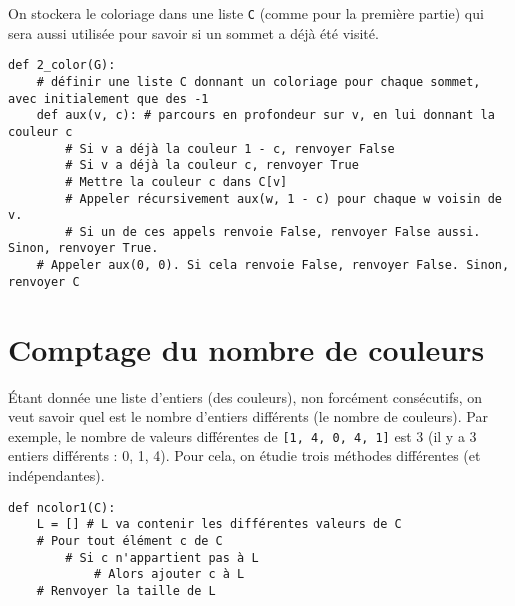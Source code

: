 On stockera le coloriage dans une liste \lstinline{C} (comme pour la première partie) qui sera aussi utilisée pour savoir si un sommet a déjà été
visité.

\begin{lstlisting}
def 2_color(G):
    # définir une liste C donnant un coloriage pour chaque sommet, avec initialement que des -1
    def aux(v, c): # parcours en profondeur sur v, en lui donnant la couleur c
        # Si v a déjà la couleur 1 - c, renvoyer False
        # Si v a déjà la couleur c, renvoyer True
        # Mettre la couleur c dans C[v]
        # Appeler récursivement aux(w, 1 - c) pour chaque w voisin de v.
        # Si un de ces appels renvoie False, renvoyer False aussi. Sinon, renvoyer True.
    # Appeler aux(0, 0). Si cela renvoie False, renvoyer False. Sinon, renvoyer C
\end{lstlisting}



\section{Comptage du nombre de couleurs}    
Étant donnée une liste d’entiers (des couleurs), non forcément consécutifs, on veut savoir quel est le nombre d’entiers différents
(le nombre de couleurs). Par exemple, le nombre de valeurs différentes de \lstinline{[1, 4, 0, 4, 1]} est 3 (il y a 3 entiers différents :
0, 1, 4). Pour cela, on étudie trois méthodes différentes (et indépendantes).


\begin{lstlisting}
def ncolor1(C):
    L = [] # L va contenir les différentes valeurs de C
    # Pour tout élément c de C
        # Si c n'appartient pas à L
            # Alors ajouter c à L
    # Renvoyer la taille de L
\end{lstlisting}


